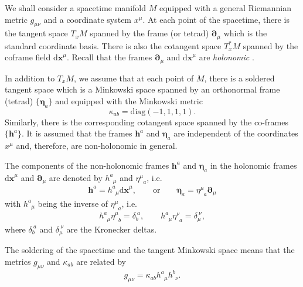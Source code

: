 \documentclass[
10pt, %
a4paper, %
oneside, %
headinclude,footinclude, %
BCOR5mm, %
]{scrartcl}
\newcommand{\mg}[1]{\kappa_{#1}}			%
\newcommand{\pdd}[1]{{\bm{\partial}_{#1}}}
\newcommand{\dx}[1]{{\bm{\mathrm{d}x}^{#1}}}
\newcommand{\tetrsymbol}{h}
\newcommand{\itetrsymbol}{\eta}
\newcommand{\itetr}[2]{\itetrsymbol^{#1}_{\phantom{#1}#2}}
\newcommand{\tetr}[2]{\tetrsymbol^{#1}_{\phantom{#1}#2}}
\newcommand{\cobas}[1]{\bm{\tetrsymbol}^{#1}}
\newcommand{\bas}[1]{\bm{\itetrsymbol}_{#1}}
\newcommand{\KD}[2]{\delta^{\ #1}_{#2}}
\newcommand{\ho}[1]{\textcolor{magenta}{HO: #1}}
\begin{document}
We shall consider a spacetime manifold $ M $ equipped with a general Riemannian metric $ g_{\mu\nu} 
$ and a coordinate system $ x^\mu $. At each 
point of 
the spacetime, there is the tangent space $ T_{x}M $ spanned by the frame (or tetrad) $ 
\pdd{\mu} $ which is the standard coordinate basis. 
There is also the cotangent space $ T_x^*M $ spanned by the coframe field $ \dx{\mu} $. 
Recall that the frames $ \pdd{\mu} $ and $ \dx{\mu} $ are \emph{holonomic} 
\cite{AldrovandiPereiraBook}.


In addition to $ T_{x}M $, we assume that at each point of $ M $, there is a soldered tangent space 
which is a Minkowski space spanned by an orthonormal frame (tetrad) $ \{ \bas{a} \}$ and equipped 
with 
the 
Minkowski metric 
\begin{equation}\label{eqn.mg}
	\mg{ab} = \text{diag}(-1,1,1,1).
\end{equation}
Similarly, there is the 
corresponding cotangent space spanned by the co-frames $ \{ \cobas{a} \}$. It is assumed 
that the frames $ \cobas{a} $ and $ \bas{a} $ are independent of the coordinates $ x^\mu $ and, 
therefore, are non-holonomic in general.

The components of the non-holonomic frames $ \cobas{a} $ and $ \bas{a} $ in the holonomic 
frames $ \dx{\mu} $ and $ \pdd{\mu} $ are denoted by $ \tetr{a}{\mu} $ and $ \itetr{\mu}{a} $, i.e. 
\begin{equation}
	\cobas{a} = \tetr{a}{\mu}\dx{\mu}, \qquad \text{or} \qquad \bas{a} = \itetr{\mu}{a}\pdd{\mu}
\end{equation}
with $ \tetr{a}{\mu} $ being the inverse of $ \itetr{\mu}{a} $, i.e.
\begin{equation}\label{eqn.inv.tetr}
	\tetr{a}{\mu} \itetr{\mu}{b} = \KD{a}{b},
	\qquad
	\tetr{a}{\mu} \itetr{\nu}{a} = \KD{\nu}{\mu},
\end{equation}
where $ \KD{a}{b} $ and $ \KD{\nu}{\mu} $ are the Kronecker deltas.

The soldering of the spacetime and the tangent Minkowski space means that the metrics $ g_{\mu\nu} 
$ and $ \mg{ab} $ are related by  
\begin{equation}
	g_{\mu\nu} = \mg{ab} \tetr{a}{\mu}\tetr{b}{\nu}.
\end{equation}
\end{document}
